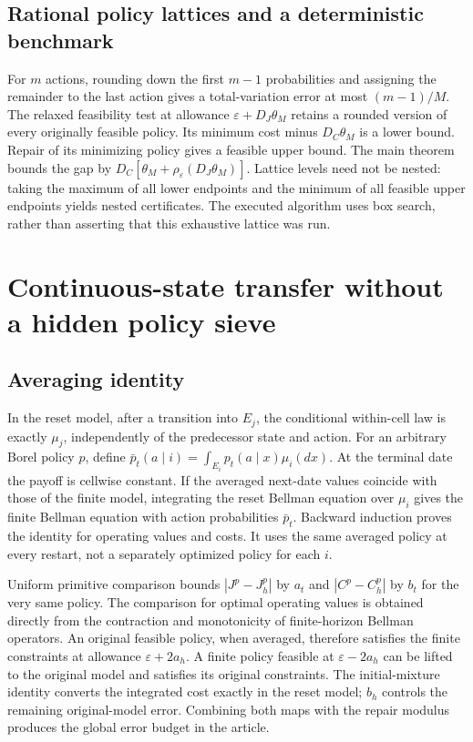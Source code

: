 \subsection{Rational policy lattices and a deterministic benchmark}
For $m$ actions, rounding down the first $m-1$ probabilities and assigning the remainder to the last action gives a total-variation error at most $(m-1)/M$. The relaxed feasibility test at allowance $\varepsilon+D_J\theta_M$ retains a rounded version of every originally feasible policy. Its minimum cost minus $D_C\theta_M$ is a lower bound. Repair of its minimizing policy gives a feasible upper bound. The main theorem bounds the gap by $D_C[\theta_M+\rho_\varepsilon(D_J\theta_M)]$. Lattice levels need not be nested: taking the maximum of all lower endpoints and the minimum of all feasible upper endpoints yields nested certificates. The executed algorithm uses box search, rather than asserting that this exhaustive lattice was run.

\section{Continuous-state transfer without a hidden policy sieve}
\subsection{Averaging identity}
In the reset model, after a transition into $E_j$, the conditional within-cell law is exactly $\mu_j$, independently of the predecessor state and action. For an arbitrary Borel policy $p$, define $\bar p_t(a\mid i)=\int_{E_i}p_t(a\mid x)\mu_i(dx)$. At the terminal date the payoff is cellwise constant. If the averaged next-date values coincide with those of the finite model, integrating the reset Bellman equation over $\mu_i$ gives the finite Bellman equation with action probabilities $\bar p_t$. Backward induction proves the identity for operating values and costs. It uses the same averaged policy at every restart, not a separately optimized policy for each $i$.

Uniform primitive comparison bounds $|J^p-J_h^p|$ by $a_t$ and $|C^p-C_h^p|$ by $b_t$ for the very same policy. The comparison for optimal operating values is obtained directly from the contraction and monotonicity of finite-horizon Bellman operators. An original feasible policy, when averaged, therefore satisfies the finite constraints at allowance $\varepsilon+2a_h$. A finite policy feasible at $\varepsilon-2a_h$ can be lifted to the original model and satisfies its original constraints. The initial-mixture identity converts the integrated cost exactly in the reset model; $b_h$ controls the remaining original-model error. Combining both maps with the repair modulus produces the global error budget in the article.

